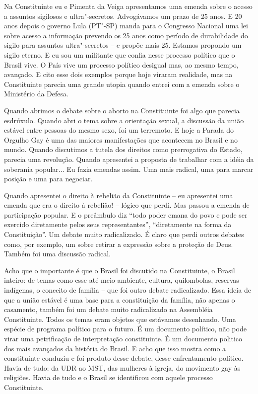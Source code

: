 Na Constituinte eu e Pimenta da Veiga apresentamos uma emenda sobre o
acesso a assuntos sigilosos e ultra"-secretos. Advogávamos um prazo de 25
anos. E 20 anos depois o governo Lula (PT"-SP) manda para o Congresso
Nacional uma lei sobre acesso a informação prevendo os 25 anos como
período de durabilidade do sigilo para assuntos ultra"-secretos -- e
propõe mais 25. Estamos propondo um sigilo eterno. E eu sou um militante
que confia nesse processo político que o Brasil vive. O País vive um
processo político desigual mas, ao mesmo tempo, avançado. E cito esse
dois exemplos porque hoje viraram realidade, mas na Constituinte parecia
uma grande utopia quando entrei com a emenda sobre o Ministério da
Defesa.

Quando abrimos o debate sobre o aborto na Constituinte foi algo que
parecia esdrúxulo. Quando abri o tema sobre a orientação sexual, a
discussão da união estável entre pessoas do mesmo sexo, foi um
terremoto. E hoje a Parada do Orgulho Gay é uma das maiores
manifestações que acontecem no Brasil e no mundo. Quando discutimos a
tutela dos direitos como prerrogativa do Estado, parecia uma revolução.
Quando apresentei a proposta de trabalhar com a idéia da soberania
popular... Eu fazia emendas assim. Uma mais radical, uma para marcar
posição e uma para negociar.

Quando apresentei o direito à rebelião da Constituinte -- eu apresentei
uma emenda que era o direito à rebelião! -- lógico que perdi. Mas passou
a emenda de participação popular. E o preâmbulo diz ``todo poder emana
do povo e pode ser exercido diretamente pelos seus representantes'',
``diretamente na forma da Constituição''. Um debate muito radicalizado.
É claro que perdi outros debates como, por exemplo, um sobre retirar a
expressão sobre a proteção de Deus. Também foi uma discussão radical.

Acho que o importante é que o Brasil foi discutido na Constituinte, o
Brasil inteiro: de temas como esse até meio ambiente, cultura,
quilombolas, reservas indígenas, o conceito de família -- que foi outro
debate radicalizado. Essa ideia de que a união estável é uma base para a
constituição da família, não apenas o casamento, também foi um debate
muito radicalizado na Assembléia Constituinte. Todos os temas eram
objetos que estávamos desenhando. Uma espécie de programa político para
o futuro. É um documento político, não pode virar uma petrificação de
interpretação constituinte. É um documento politico dos mais avançados
da história do Brasil. E acho que isso mostra como a constituinte
conduziu e foi produto desse debate, desse enfrentamento político. Havia
de tudo: da UDR ao MST, das mulheres à igreja, do movimento gay às
religiões. Havia de tudo e o Brasil se identificou com aquele processo
Constituinte.

